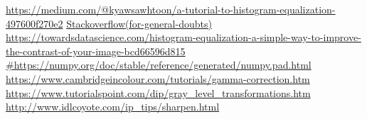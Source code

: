 \documentclass[conference]{IEEEtran}
\begin{document}
{{%



\newpage
\begin{thebibliography}{00}
 \url{https://medium.com/@kyawsawhtoon/a-tutorial-to-histogram-equalization-497600f270e2}
 \url{Stackoverflow(for-general-doubts)}
 \url{https://towardsdatascience.com/histogram-equalization-a-simple-way-to-improve-the-contrast-of-your-image-bcd66596d815}
 \url{#https://numpy.org/doc/stable/reference/generated/numpy.pad.html}
 \url{https://www.cambridgeincolour.com/tutorials/gamma-correction.htm}
 \url{https://www.tutorialspoint.com/dip/gray_level_transformations.htm}
 \url{http://www.idlcoyote.com/ip_tips/sharpen.html}
\end{thebibliography}

\vspace{12pt}
}}
\end{document}

